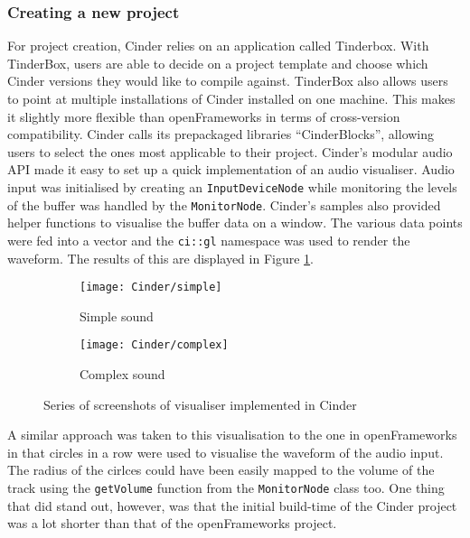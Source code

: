 \documentclass[../../initial_thesis.tex]{subfiles}
\begin{document}
\subsubsection{Creating a new project}
For project creation, Cinder relies on an application called Tinderbox. With TinderBox, users are able to decide on a project template and choose which Cinder versions they would like to compile against. TinderBox also allows users to point at multiple installations of Cinder installed on one machine. This makes it slightly more flexible than openFrameworks in terms of cross-version compatibility. Cinder calls its prepackaged libraries ``CinderBlocks'', allowing users to select the ones most applicable to their project. Cinder's modular audio API made it easy to set up a quick implementation of an audio visualiser. Audio input was initialised by creating an \verb|InputDeviceNode| while monitoring the levels of the buffer was handled by the \verb|MonitorNode|. Cinder's samples also provided helper functions to visualise the buffer data on a window. The various data points were fed into a vector and the \verb|ci::gl| namespace was used to render the waveform. The results of this are displayed in Figure \ref{fig:cinderVisualiser}.\footnotemark
{}

\begin{figure}
  \begin{subfigure}{0.5\textwidth}
    \centering
    \texttt{[image: Cinder/simple]}
    \caption{Simple sound}
  \end{subfigure}
  \begin{subfigure}{0.5\textwidth}
    \centering
    \texttt{[image: Cinder/complex]}
    \caption{Complex sound}
  \end{subfigure}
  \caption{Series of screenshots of visualiser implemented in Cinder}
  \label{fig:cinderVisualiser}
\end{figure}

A similar approach was taken to this visualisation to the one in openFrameworks in that circles in a row were used to visualise the waveform of the audio input. The radius of the cirlces could have been easily mapped to the volume of the track using the \verb|getVolume| function from the \verb|MonitorNode| class too. One thing that did stand out, however, was that the initial build-time of the Cinder project was a lot shorter than that of the openFrameworks project.
\end{document}

